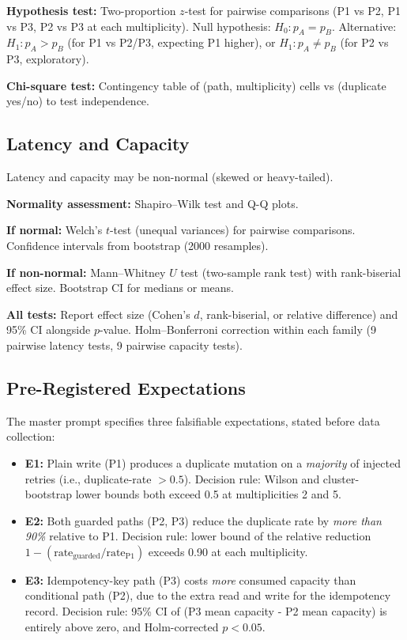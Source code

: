 \textbf{Hypothesis test:} Two-proportion $z$-test for pairwise comparisons (P1 vs P2, P1 vs P3, P2 vs P3 at each multiplicity). Null hypothesis: $H_0: p_A = p_B$. Alternative: $H_1: p_A > p_B$ (for P1 vs P2/P3, expecting P1 higher), or $H_1: p_A \neq p_B$ (for P2 vs P3, exploratory).

\textbf{Chi-square test:} Contingency table of (path, multiplicity) cells vs (duplicate yes/no) to test independence.

\subsection{Latency and Capacity}

Latency and capacity may be non-normal (skewed or heavy-tailed).

\textbf{Normality assessment:} Shapiro–Wilk test and Q-Q plots.

\textbf{If normal:} Welch's $t$-test (unequal variances) for pairwise comparisons. Confidence intervals from bootstrap (2000 resamples).

\textbf{If non-normal:} Mann–Whitney $U$ test (two-sample rank test) with rank-biserial effect size. Bootstrap CI for medians or means.

\textbf{All tests:} Report effect size (Cohen's $d$, rank-biserial, or relative difference) and 95\% CI alongside $p$-value. Holm–Bonferroni correction within each family (9 pairwise latency tests, 9 pairwise capacity tests).

\subsection{Pre-Registered Expectations}

The master prompt specifies three falsifiable expectations, stated before data collection:

\begin{itemize}
    \item \textbf{E1:} Plain write (P1) produces a duplicate mutation on a \textit{majority} of injected retries (i.e., duplicate-rate $> 0.5$). Decision rule: Wilson and cluster-bootstrap lower bounds both exceed 0.5 at multiplicities 2 and 5.
    \item \textbf{E2:} Both guarded paths (P2, P3) reduce the duplicate rate by \textit{more than 90\%} relative to P1. Decision rule: lower bound of the relative reduction $1 - (\text{rate}_{\text{guarded}} / \text{rate}_{\text{P1}})$ exceeds 0.90 at each multiplicity.
    \item \textbf{E3:} Idempotency-key path (P3) costs \textit{more} consumed capacity than conditional path (P2), due to the extra read and write for the idempotency record. Decision rule: 95\% CI of (P3 mean capacity - P2 mean capacity) is entirely above zero, and Holm-corrected $p < 0.05$.
\end{itemize}

